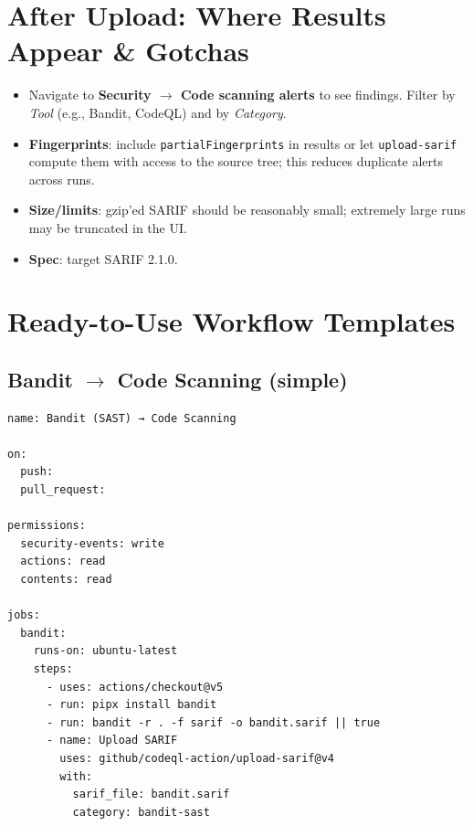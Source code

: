 \documentclass[11pt,a4paper]{article}
\providecommand{\term}[1]{\texttt{#1}}
\begin{document}
\section{After Upload: Where Results Appear \& Gotchas}
\begin{itemize}
  \item Navigate to \textbf{Security $\rightarrow$ Code scanning alerts} to see findings. Filter by \emph{Tool} (e.g., Bandit, CodeQL) and by \emph{Category}.
  \item \textbf{Fingerprints}: include \term{partialFingerprints} in results or let \term{upload-sarif} compute them with access to the source tree; this reduces duplicate alerts across runs.
  \item \textbf{Size/limits}: gzip'ed SARIF should be reasonably small; extremely large runs may be truncated in the UI.
  \item \textbf{Spec}: target SARIF 2.1.0.
\end{itemize}
\clearpage

\section{Ready-to-Use Workflow Templates}
\subsection{Bandit $\rightarrow$ Code Scanning (simple)}
\begin{verbatim}
name: Bandit (SAST) → Code Scanning

on:
  push:
  pull_request:

permissions:
  security-events: write
  actions: read
  contents: read

jobs:
  bandit:
    runs-on: ubuntu-latest
    steps:
      - uses: actions/checkout@v5
      - run: pipx install bandit
      - run: bandit -r . -f sarif -o bandit.sarif || true
      - name: Upload SARIF
        uses: github/codeql-action/upload-sarif@v4
        with:
          sarif_file: bandit.sarif
          category: bandit-sast
\end{verbatim}
\clearpage
\end{document}
